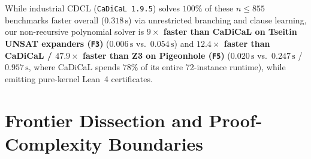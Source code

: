 \documentclass[11pt]{article}
\begin{document}
\begin{table}[t]
\centering
\caption{External SOTA baseline comparison on the $72$ high-scale (\texttt{F1}--\texttt{F5}) and $18$ coupled (\texttt{F6}) benchmarks ($10.0\,\text{s}$ timeout/instance).}
\label{tab:sota}
\end{table}

While industrial CDCL (\texttt{CaDiCaL~1.9.5}) solves $100\%$ of these $n \le 855$ benchmarks faster overall ($0.318\,\text{s}$) via unrestricted branching and clause learning, our non-recursive polynomial solver is \textbf{$9\times$ faster than CaDiCaL on Tseitin UNSAT expanders (\texttt{F3})} ($0.006\,\text{s}$ vs.\ $0.054\,\text{s}$) and \textbf{$12.4\times$ faster than CaDiCaL / $47.9\times$ faster than Z3 on Pigeonhole (\texttt{F5})} ($0.020\,\text{s}$ vs.\ $0.247\,\text{s}$ / $0.957\,\text{s}$, where CaDiCaL spends $78\%$ of its entire 72-instance runtime), while emitting pure-kernel Lean~4 certificates.

\section{Frontier Dissection and Proof-Complexity Boundaries}
\end{document}

